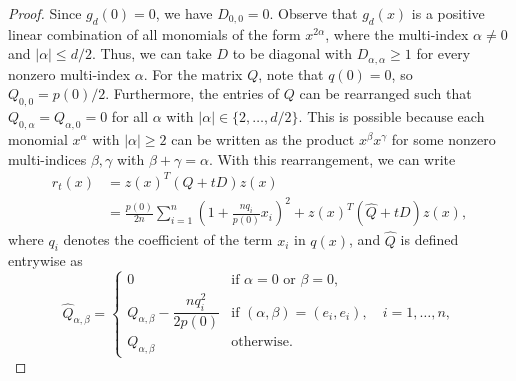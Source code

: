 \documentclass[12pt]{article}
\theoremstyle{remark}
\begin{document}
\begin{proof}
Since $g_d(0)=0$, we have $D_{0,0}=0$. Observe that $g_d(x)$ is a positive linear combination of all monomials of the form $x^{2\alpha}$, where the multi-index $\alpha\neq 0$ and $|\alpha|\le d/2$. Thus, we can take $D$ to be diagonal with $D_{\alpha,\alpha}\ge 1$ for every nonzero multi-index $\alpha$. For the matrix $Q$, note that $q(0)=0$, so  $Q_{0,0}=p(0)/2$. Furthermore, the entries of $Q$ can be rearranged such that $Q_{0,\alpha}=Q_{\alpha,0}=0$ for all $\alpha$ with $|\alpha|\in\{2,\ldots, d/2\}$. This is possible because each monomial $x^{\alpha}$ with $|\alpha|\ge 2$ can be written as the product $x^{\beta}x^{\gamma}$ for some nonzero multi-indices $\beta,\gamma$ with $\beta+\gamma=\alpha$. With this rearrangement, we can write
\begin{equation}\label{eq:degd_nonhomo_rtx}
    \begin{aligned}
r_t(x)&=z(x)^T(Q+tD)z(x)\\
&=\frac{p(0)}{2n}\sum_{i=1}^n\left(1+\frac{nq_i}{p(0)}x_i\right)^2+z(x)^T(\hat{Q}+tD)z(x),
\end{aligned}
\end{equation}
where $q_i$ denotes the coefficient of the term $x_i$ in $q(x)$, and $\hat{Q}$ is defined entrywise as 
\[\hat{Q}_{\alpha,\beta}=
\begin{cases}
    0  & \text{if } \alpha= 0 \text{ or } \beta=0, \\
    Q_{\alpha,\beta}-\dfrac{nq_{i}^2}{2p(0)} & \text{if } (\alpha,\beta)=(e_i,e_i),\quad i=1,\ldots,n,\\ 
    Q_{\alpha,\beta} & \text{otherwise.}
\end{cases}\]

\end{proof}
\end{document}
